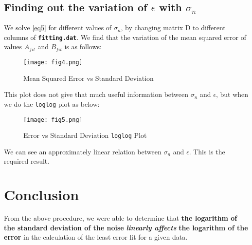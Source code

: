 \documentclass[11pt, a4paper]{article}
\begin{document}
        \subsection{Finding out the variation of $\epsilon$ with $\sigma_n$}
            We solve \eqref{eq5} for different values of $\sigma_n$, by changing matrix D to different columns of \texttt{\textbf{fitting.dat}}. We find that the variation of the mean squared error of values $A_{fit}$ and $B_{fit}$ is as follows:
            \begin{figure}[H]
                \centering
                \texttt{[image: fig4.png]} 
                \caption{Mean Squared Error vs Standard Deviation}
                \label{fig:errorSTD}
            \end{figure}

            This plot does not give that much useful information between $\sigma_n$ and $\epsilon$, but when we do the \texttt{loglog} plot as below:
            \begin{figure}[H]
                \centering
                \texttt{[image: fig5.png]}
                \caption{Error vs Standard Deviation \texttt{loglog} Plot}
                \label{fig:errorSTDloglog}
            \end{figure}

            We can see an approximately linear relation between $\sigma_n$ and $\epsilon$. This is the required result.

    \section{Conclusion}
        From the above procedure, we were able to determine that \textbf{the logarithm of the standard deviation of the noise} \textit{\textbf{linearly affects}} \textbf{the logarithm of the error} in the calculation of the least error fit for a given data.
\end{document}
